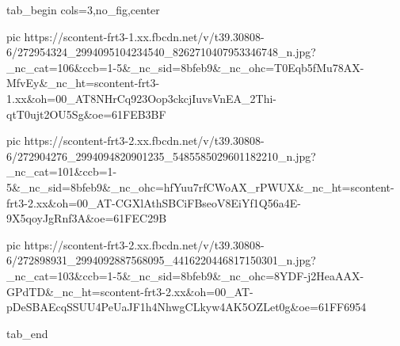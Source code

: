  
 
 
 
 


\ifcmt
  tab_begin cols=3,no_fig,center

     pic https://scontent-frt3-1.xx.fbcdn.net/v/t39.30808-6/272954324_2994095104234540_8262710407953346748_n.jpg?_nc_cat=106&ccb=1-5&_nc_sid=8bfeb9&_nc_ohc=T0Eqb5fMu78AX-MfvEy&_nc_ht=scontent-frt3-1.xx&oh=00_AT8NHrCq923Oop3ckcjIuvsVnEA_2Thi-qtT0ujt2OU5Sg&oe=61FEB3BF

     pic https://scontent-frt3-2.xx.fbcdn.net/v/t39.30808-6/272904276_2994094820901235_5485585029601182210_n.jpg?_nc_cat=101&ccb=1-5&_nc_sid=8bfeb9&_nc_ohc=hfYuu7rfCWoAX_rPWUX&_nc_ht=scontent-frt3-2.xx&oh=00_AT-CGXlAthSBCiFBseoV8EiYf1Q56a4E-9X5qoyJgRnf3A&oe=61FEC29B

     pic https://scontent-frt3-2.xx.fbcdn.net/v/t39.30808-6/272898931_2994092887568095_4416220446817150301_n.jpg?_nc_cat=103&ccb=1-5&_nc_sid=8bfeb9&_nc_ohc=8YDF-j2HeaAAX-GPdTD&_nc_ht=scontent-frt3-2.xx&oh=00_AT-pDeSBAEcqSSUU4PeUaJF1h4NhwgCLkyw4AK5OZLet0g&oe=61FF6954

  tab_end
\fi
